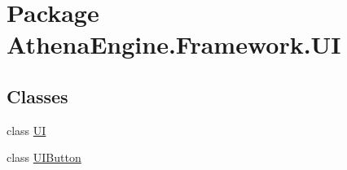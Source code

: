 \hypertarget{namespace_athena_engine_1_1_framework_1_1_u_i}{\section{Package Athena\-Engine.\-Framework.\-U\-I}
\label{namespace_athena_engine_1_1_framework_1_1_u_i}
}
\subsection*{Classes}
\begin{DoxyCompactItemize}
\item 
class \hyperlink{class_athena_engine_1_1_framework_1_1_u_i_1_1_u_i}{U\-I}
\item 
class \hyperlink{class_athena_engine_1_1_framework_1_1_u_i_1_1_u_i_button}{U\-I\-Button}
\end{DoxyCompactItemize}
